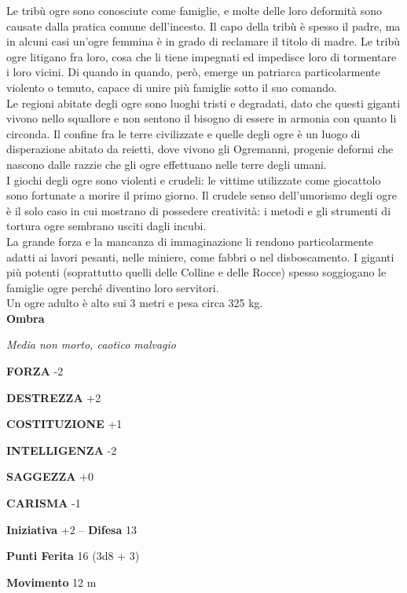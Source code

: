 \begin{multicols}{2}
Le tribù ogre sono conosciute come famiglie, e molte delle loro deformità sono causate dalla pratica comune dell'incesto. Il capo della tribù è spesso il padre, ma in alcuni casi un'ogre femmina è in grado di reclamare il titolo di madre. Le tribù ogre litigano fra loro, cosa che li tiene impegnati ed impedisce loro di tormentare i loro vicini. Di quando in quando, però, emerge un patriarca particolarmente violento o temuto, capace di unire più famiglie sotto il suo comando.\\

Le regioni abitate degli ogre sono luoghi tristi e degradati, dato che questi giganti vivono nello squallore e non sentono il bisogno di essere in armonia con quanto li circonda. Il confine fra le terre civilizzate e quelle degli ogre è un luogo di disperazione abitato da reietti, dove vivono gli Ogremanni, progenie deformi che nascono dalle razzie che gli ogre effettuano nelle terre degli umani.\\

I giochi degli ogre sono violenti e crudeli: le vittime utilizzate come giocattolo sono fortunate a morire il primo giorno. Il crudele senso dell'umorismo degli ogre è il solo caso in cui mostrano di possedere creatività: i metodi e gli strumenti di tortura ogre sembrano usciti dagli incubi.\\

La grande forza e la mancanza di immaginazione li rendono particolarmente adatti ai lavori pesanti, nelle miniere, come fabbri o nel disboscamento. I giganti più potenti (soprattutto quelli delle Colline e delle Rocce) spesso soggiogano le famiglie ogre perché diventino loro servitori.\\
Un ogre adulto è alto sui 3 metri e pesa circa 325 kg.\\


\medskip{}\textbf{Ombra}

\emph{Media non morto, caotico malvagio}

\textbf{FORZA} -2

\textbf{DESTREZZA} +2

\textbf{COSTITUZIONE} +1

\textbf{INTELLIGENZA} -2

\textbf{SAGGEZZA} +0

\textbf{CARISMA} -1

\textbf{Iniziativa} +2 -- \textbf{Difesa} 13

\textbf{Punti Ferita} 16 (3d8 + 3)

\textbf{Movimento} 12 m


\end{multicols}
